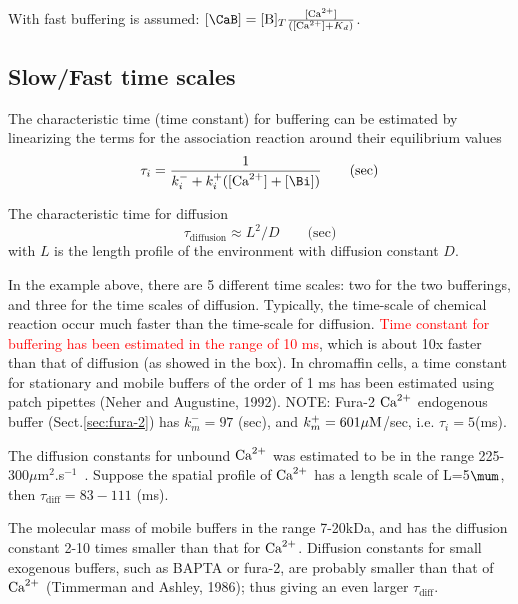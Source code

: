 With fast buffering is assumed:
$[\CaB]=[\B]_T\frac{[\Ca]}{([\Ca]+K_d)}$.



\subsection{Slow/Fast time scales}
\label{sec:time-scales}
\label{sec:slow_rapid-bufferings}

\begin{framed}

The characteristic time (time constant) for buffering can be estimated by
linearizing the terms for the association reaction around their equilibrium values
\begin{equation}
  \label{eq:1095}
  \tau_i = \frac{1}{k^-_i+k^+_i([\Ca]+[\Bi])} \qquad \text{(sec)}
\end{equation}

The characteristic time for diffusion 
\begin{equation}
  \label{eq:1096}
  \tau_\text{diffusion} \approx L^2/D  \qquad \text{(sec)}
\end{equation}
with $L$ is the length profile of the environment with diffusion
constant $D$.

\end{framed}

In the example above, there are 5 different time scales: two for the two
bufferings, and three for the time scales of diffusion.
Typically, the time-scale of chemical reaction occur much faster than the
time-scale for diffusion. \textcolor{red}{Time constant for buffering has been
estimated in the range of 10 ms}, which is about 10x faster than that of
diffusion (as showed in the box). In chromaffin cells, a time constant for
stationary and mobile buffers of the order of 1 ms has been estimated using
patch pipettes (Neher and Augustine, 1992). NOTE: Fura-2 ${\text{Ca}^{2+}}$ endogenous buffer
 (Sect.\ref{sec:fura-2}) has $k^-_m = 97$ (sec), and $k^+_m = 601 {\mu\text{M}}$/sec,
 i.e. $\tau_i = 5$(ms).


\begin{framed}
  The diffusion constants for unbound ${\text{Ca}^{2+}}$ was estimated to be in the
  range 225-300$\mu$m$^2$.s$^{-1}$~\citep{zhou1993}. Suppose the spatial profile
  of ${\text{Ca}^{2+}}$ has a length scale of L=5$\mum$, then $\tau_\text{diff}=83-111$ (ms).
  
  The molecular mass of mobile buffers in the range 7-20kDa, and has the
  diffusion constant 2-10 times smaller than that for ${\text{Ca}^{2+}}$.
  Diffusion constants for small exogenous buffers, such as BAPTA or fura-2, are
  probably smaller than that of ${\text{Ca}^{2+}}$ (Timmerman and Ashley, 1986); thus giving
  an even larger $\tau_\text{diff}$.
\end{framed}

